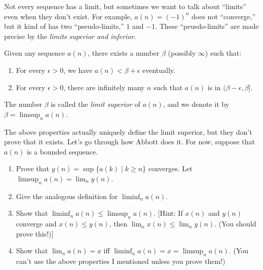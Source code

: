\documentclass[12pt]{article}
\theoremstyle{definition}
\begin{document}
Not every sequence has a limit, but sometimes we want to talk about ``limits''
even when they don't exist. For example, $a(n) = (-1)^n$ does not ``converge,''
but it kind of has two ``pseudo-limits,'' $1$ and $-1$. These ``peusdo-limits''
are made precise by the \emph{limits superior and inferior}.

Given any sequence $a(n)$, there exists a number $\beta$ (possibly $\infty$)
such that:
\begin{enumerate}
    \item For every $\epsilon > 0$, we have $a(n) < \beta + \epsilon$ eventually.

    \item For every $\epsilon > 0$, there are infinitely many $n$ such that
        $a(n)$ is in $(\beta - \epsilon, \beta]$.
\end{enumerate}
The number $\beta$ is called the \emph{limit superior} of $a(n)$, and we denote
it by $\beta = \limsup_n a(n)$.

The above properties actually uniquely define the limit superior, but they
don't prove that it exists. Let's go through how Abbott does it. For now,
suppose that $a(n)$ is a bounded sequence.

\begin{enumerate}[label=(\alph*)]
    \item Prove that $y(n) = \sup \{a(k) \mid k \geq n\}$ converges. Let
        $\limsup_n a(n) = \lim_n y(n)$.


    \item Give the analogous definition for $\liminf_n a(n)$.


    \item Show that $\liminf_n a(n) \leq \limsup_n a(n)$. [Hint: If $x(n)$ and
        $y(n)$ converge and $x(n) \leq y(n)$, then $\lim_n x(n) \leq \lim_n
        y(n)$. (You should prove this!)]


    \item Show that $\lim_n a(n) = x$ iff $\liminf_n a(n) = x = \limsup_n
        a(n)$. (You can't use the above properties I mentioned unless you prove
        them!)


\end{enumerate}
\end{document}
